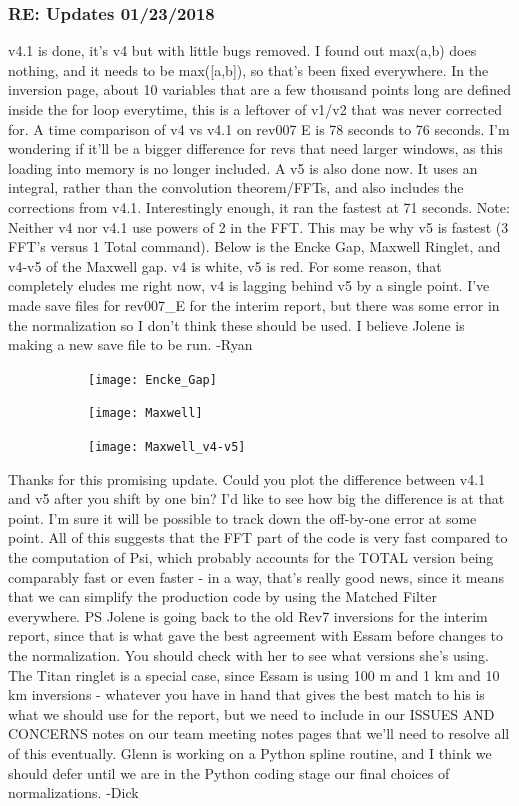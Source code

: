 \documentclass[crop=false,class=book]{standalone}
\begin{document}
\subsubsection{\footnotesize RE: Updates 01/23/2018}
v4.1 is done, it's v4 but with little bugs removed. I found out max(a,b) does nothing, and it needs to be max([a,b]), so that's been fixed everywhere. In the inversion page, about 10 variables that are a few thousand points long are defined inside the for loop everytime, this is a leftover of v1/v2 that was never corrected for. A time comparison of v4 vs v4.1 on rev007 E is 78 seconds to 76 seconds. I'm wondering if it'll be a bigger difference for revs that need larger windows, as this loading into memory is no longer included. A v5 is also done now. It uses an integral, rather than the convolution theorem/FFTs, and also includes the corrections from v4.1. Interestingly enough, it ran the fastest at 71 seconds. Note: Neither v4 nor v4.1 use powers of 2 in the FFT. This may be why v5 is fastest (3 FFT's versus 1 Total command). Below is the Encke Gap, Maxwell Ringlet, and v4-v5 of the Maxwell gap. v4 is white, v5 is red. For some reason, that completely eludes me right now, v4 is lagging behind v5 by a single point. I've made save files for rev007\_E for the interim report, but there was some error in the normalization so I don't think these should be used. I believe Jolene is making a new save file to be run. -Ryan
\begin{figure}[H]
    \centering
    \begin{subfigure}[b]{0.32\textwidth}
        \texttt{[image: Encke\_Gap]}
    \end{subfigure}
    \begin{subfigure}[b]{0.32\textwidth}
        \texttt{[image: Maxwell]}
    \end{subfigure}
    \begin{subfigure}[b]{0.32\textwidth}
        \texttt{[image: Maxwell\_v4-v5]}
    \end{subfigure}
\end{figure}
Thanks for this promising update. Could you plot the difference between v4.1 and v5 after you shift by one bin? I'd like to see how big the difference is at that point. I'm sure it will be possible to track down the off-by-one error at some point. 
All of this suggests that the FFT part of the code is very fast compared to the computation of Psi, which probably accounts for the TOTAL version being comparably fast or even faster - in a way, that's really good news, since it means that we can simplify the production code by using the Matched Filter everywhere. PS Jolene is going back to the old Rev7 inversions for the interim report, since that is what gave the best agreement with Essam before changes to the normalization. You should check with her to see what versions she's using. The Titan ringlet is a special case, since Essam is using 100 m and 1 km  and 10 km inversions - whatever you have in hand that gives the best match to his is what we should use for the report, but we need to include in our ISSUES AND CONCERNS notes on our team meeting notes pages that we'll need to resolve all of this eventually. Glenn is working on a Python spline routine, and I think we should defer until we are in the Python coding stage our final choices of normalizations. -Dick
\end{document}

